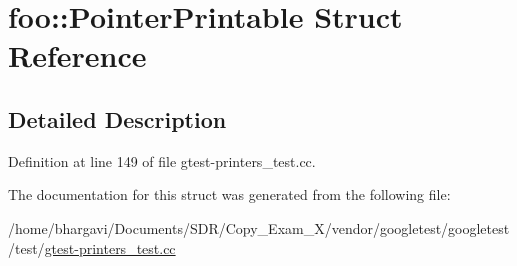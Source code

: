 \hypertarget{structfoo_1_1_pointer_printable}{}\section{foo\+:\+:Pointer\+Printable Struct Reference}
\label{structfoo_1_1_pointer_printable}


\subsection{Detailed Description}


Definition at line 149 of file gtest-\/printers\+\_\+test.\+cc.



The documentation for this struct was generated from the following file\+:\begin{DoxyCompactItemize}
\item 
/home/bhargavi/\+Documents/\+S\+D\+R/\+Copy\+\_\+\+Exam\+\_\+X/vendor/googletest/googletest/test/\hyperlink{gtest-printers__test_8cc}{gtest-\/printers\+\_\+test.\+cc}\end{DoxyCompactItemize}
